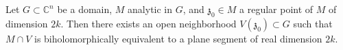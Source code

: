 Let $G \subset \mathbb{C}^n$ be a domain, $M$ analytic in $G$, and $\mathfrak{z}_0 \in M$ a regular point of $M$ of dimension $2k$. Then there exists an open neighborhood $V(\mathfrak{z}_0) \subset G$ such that $M \cap V$ is biholomorphically equivalent to a plane segment of real dimension $2k$.
